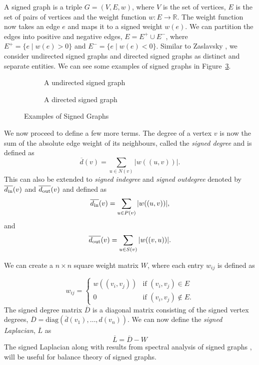 A signed graph is a triple $G=(V,E,w)$, where $V$ is the set of vertices, $E$ is the set of pairs of vertices and the weight function $w:E \rightarrow \mathbb{R}$.
The weight function now takes an edge $e$ and maps it to a signed weight $w(e)$.
We can partition the edges into positive and negative edges, $E = E^{+}\cup E^{-}$, where $E^{+} = \{e \mid w(e)>0\}$ and $E^{-}=\{e \mid w(e)<0\}$.
Similar to Zaslavsky \cite{zaslavsky1982signed}, we consider undirected signed graphs and directed signed graphs as distinct and separate entities.
We can see some examples of signed graphs in Figure~\ref{fig:signed-graphs}.
\begin{figure}[!ht]
    \centering
    \begin{subfigure}{0.5\textwidth}
        \centering
        
        \caption{A undirected signed graph}
        \label{fig:signed-undirected}
    \end{subfigure}

    \begin{subfigure}{0.5\textwidth}
        \centering
        
        \caption{A directed signed graph}
        \label{fig:signed-directed graph}
    \end{subfigure}
    \caption{Examples of Signed Graphs}
    \label{fig:signed-graphs}
\end{figure}

We now proceed to define a few more terms.
The degree of a vertex $v$ is now the sum of the absolute edge weight of its neighbours, called the \textit{signed degree} and is defined as 
\[
    \overline{d}(v) = \sum_{u \in N(v)}|w((u,v))|.
\] 
This can also be extended to \textit{signed indegree} and \textit{signed outdegree} denoted by $\overline{d_{\text{in}}}(v)$ and $\overline{d_{\text{out}}}(v)$ and defined as
\[
    \overline{d_{\text{in}}}(v)=\sum_{u \in P(v)}|w((u,v))|,
\] 
and
\[
    \overline{d_{\text{out}}}(v)=\sum_{u \in S(v)}|w((v,u))|.
\] 

We can create a $n \times n$ square weight matrix $W$, where each entry $w_{ij}$ is defined as 

\[ w_{ij} = 
\begin{cases}
    w((v_i,v_j)) & \text{if } (v_i,v_j) \in E \\
    0 & \text{if } (v_i,v_j) \notin E      .
\end{cases}
\] 
The signed degree matrix $\overline{D}$ is a diagonal matrix consisting of the signed vertex degrees, $\overline{D} = \text{diag}(\overline{d}(v_{1}),\dots,d(v_n))$.
We can now define the \textit{signed Laplacian}, $\overline{L}$ as 
\[ \overline{L} = \overline{D} - W\]
The signed Laplacian along with results from spectral analysis of signed graphs \cite{hou2005bounds,kunegis2010spectral}, will be useful for balance theory of signed graphs. 

